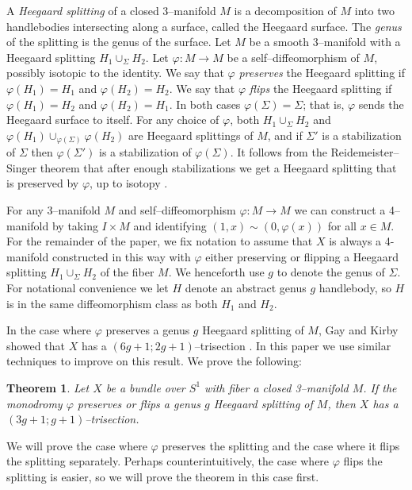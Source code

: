 \documentclass[12pt]{amsart}
\newtheorem{thm}{Theorem}
\theoremstyle{definition}
\theoremstyle{remark}
\begin{document}
A \emph{Heegaard splitting} of a closed 3--manifold $M$ is a decomposition of $M$ into two handlebodies intersecting along a surface, called the Heegaard surface.  The \emph{genus} of the splitting is the genus of the surface.  Let $M$ be a smooth 3--manifold with a Heegaard splitting $H_1 \cup_\Sigma H_2$.  Let $\varphi \colon M \to M$ be a self--diffeomorphism of $M$, possibly isotopic to the identity.  We say that $\varphi$ \emph{preserves} the Heegaard splitting if $\varphi(H_1) = H_1$ and $\varphi(H_2)=H_2$.  We say that $\varphi$ \emph{flips} the Heegaard splitting if $\varphi(H_1) = H_2$ and $\varphi(H_2)=H_1$.  In both cases $\varphi(\Sigma) = \Sigma$; that is, $\varphi$ sends the Heegaard surface to itself.  For any choice of $\varphi$, both $H_1 \cup_\Sigma H_2$ and $\varphi(H_1) \cup_{\varphi(\Sigma)} \varphi(H_2)$ are Heegaard splittings of $M$, and if $\Sigma'$ is a stabilization of $\Sigma$ then $\varphi(\Sigma')$ is a stabilization of $\varphi(\Sigma)$.  It follows from the Reidemeister--Singer theorem that after enough stabilizations we get a Heegaard splitting that is preserved by $\varphi$, up to isotopy \cite{Reidemeister1}\cite{Singer1}.  

For any 3--manifold $M$ and self--diffeomorphism $\varphi \colon M \to M$ we can construct a 4--manifold by taking $I \times M$ and identifying $(1,x) \sim (0,\varphi(x))$ for all $x \in M$. For the remainder of the paper, we fix notation to assume that $X$ is always a 4-manifold constructed in this way with $\varphi$ either preserving or flipping a Heegaard splitting $H_1 \cup_\Sigma H_2$ of the fiber $M$.  We henceforth use $g$ to denote the genus of $\Sigma$.  For notational convenience we let $H$ denote an abstract genus $g$ handlebody, so $H$ is in the same diffeomorphism class as both $H_1$ and $H_2$.

In the case where $\varphi$ preserves a genus $g$ Heegaard splitting of $M$, Gay and Kirby showed that $X$ has a $(6g+1;2g+1)$--trisection \cite{GayKirby1}.  In this paper we use similar techniques to improve on this result.  We prove the following:

\begin{thm}
\label{mainresult}
Let $X$ be a bundle over $S^1$ with fiber a closed 3--manifold $M$.  If the monodromy $\varphi$ preserves or flips a genus $g$ Heegaard splitting of $M$, then $X$ has a $(3g+1;g+1)$--trisection.
\end{thm}

We will prove the case where $\varphi$ preserves the splitting and the case where it flips the splitting separately.  Perhaps counterintuitively, the case where $\varphi$ flips the splitting is easier, so we will prove the theorem in this case first.
\end{document}
